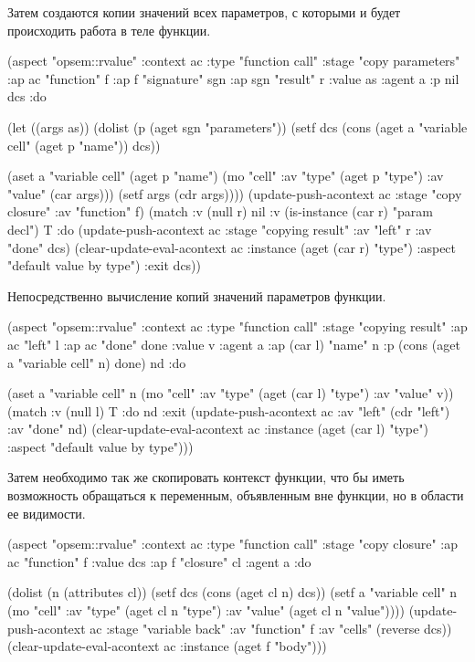 \documentclass[12pt,twoside,russian]{article}
\begin{document}
Затем создаются копии значений всех параметров, с которыми и будет происходить работа в теле функции.

\begin{ABMLCode}
(aspect "opsem::rvalue" :context ac :type "function call" 
  :stage "copy parameters" :ap ac "function" f :ap f "signature" sgn 
  :ap sgn "result" r :value as :agent a :p nil dcs :do 
  
  (let ((args as)) (dolist (p (aget sgn "parameters")) 
    (setf dcs (cons (aget a "variable cell" (aget p "name")) dcs))
    
    (aset a "variable cell" (aget p "name") (mo "cell" :av "type" (aget p "type") :av "value" (car args)))
    (setf args (cdr args))))
  (update-push-acontext ac :stage "copy closure" :av "function" f)
  (match :v (null r) nil :v (is-instance (car r) "param decl") T 
  :do (update-push-acontext ac :stage "copying result" :av "left" r 
                               :av "done" dcs)
      (clear-update-eval-acontext ac :instance (aget (car r) "type") 
                                     :aspect "default value by type")
  :exit dcs))
\end{ABMLCode}

Непосредственно вычисление копий значений параметров функции.

\begin{ABMLCode}
(aspect "opsem::rvalue" :context ac :type "function call" 
  :stage "copying result" :ap ac "left" l :ap ac "done" done :value v 
  :agent a :ap (car l) "name" n 
  :p (cons (aget a "variable cell" n) done) nd :do 
  
  (aset a "variable cell" n (mo "cell" :av "type" (aget (car l) "type") :av "value" v))
  (match :v (null l) T :do nd 
  :exit 
  (update-push-acontext ac :av "left" (cdr "left") :av "done" nd)
  (clear-update-eval-acontext ac :instance (aget (car l) "type") 
                                 :aspect "default value by type")))
\end{ABMLCode}

Затем необходимо так же скопировать контекст функции, что бы иметь возможность обращаться к переменным, объявленным вне функции, но в области ее видимости.

\begin{ABMLCode}
(aspect "opsem::rvalue" :context ac :type "function call" 
  :stage "copy closure" :ap ac "function" f :value dcs 
  :ap f "closure" cl :agent a :do 
  
  (dolist (n (attributes cl)) (setf dcs (cons (aget cl n) dcs)) 
      (setf a "variable cell" n 
        (mo "cell" :av "type" (aget cl n "type") 
                   :av "value" (aget cl n "value"))))
  (update-push-acontext ac :stage "variable back" :av "function" f 
                           :av "cells" (reverse dcs))
  (clear-update-eval-acontext ac :instance (aget f "body")))
\end{ABMLCode}
\end{document}

